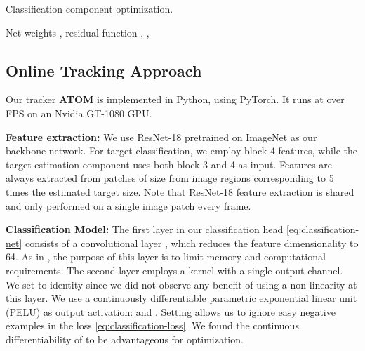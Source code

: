 \documentclass[10pt,twocolumn,letterpaper]{article}
\newcommand{\parsection}[1]{\noindent\textbf{#1:} }
\begin{document}
\newcommand{\assign}{\leftarrow}
\newcommand{\algcomment}[1]{\hspace{3mm}{\footnotesize\# #1}}
\newcommand{\sep}{\,,\quad}
\begin{algorithm}[t]
	\caption{Classification component optimization.}
	\begin{algorithmic}[1]
		\Require Net weights , residual function , , 
		\For{}
			\State 
			\State  \hspace{7.7mm}\algcomment{Treat  as constant}
			\State 
			\For{}
				\State 
				\State 
				\State  \hspace{1.7mm}\algcomment{Treat  as constant}
				\State  \hspace{0mm}\algcomment{Treat  as constant}
				\State 
				\State 
				\State 
			\EndFor
			\State 
		\EndFor
	\end{algorithmic}
	\label{alg:GNCG}
\end{algorithm}

\subsection{Online Tracking Approach}
\label{sec:online-tracking}
Our tracker \textbf{ATOM} is implemented in Python, using PyTorch. It runs at over  FPS on an Nvidia GT-1080 GPU.

\parsection{Feature extraction}
We use ResNet-18 pretrained on ImageNet as our backbone network. For target classification, we employ block 4 features, while the target estimation component uses both block 3 and 4 as input. Features are always extracted from patches of size  from image regions corresponding to 5 times the estimated target size. Note that ResNet-18 feature extraction is shared and only performed on a single image patch every frame.


\parsection{Classification Model} 
The first layer in our classification head \eqref{eq:classification-net} consists of a  convolutional layer , which reduces the feature dimensionality to 64. As in \cite{DanelljanCVPR2017}, the purpose of this layer is to limit memory and computational requirements. The second layer employs a  kernel  with a single output channel. We set  to identity since we did not observe any benefit of using a non-linearity at this layer. We use a continuously differentiable parametric exponential linear unit (PELU) \cite{PELU} as output activation:  and . Setting  allows us to ignore easy negative examples in the loss \eqref{eq:classification-loss}. We found the continuous differentiability of  to be advantageous for optimization.
\end{document}
